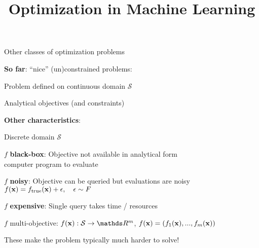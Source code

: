 \documentclass[11pt,compress,t,notes=noshow, xcolor=table]{beamer}
\title{Optimization in Machine Learning}
\begin{document}

\begin{framei}{Other classes of optimization problems}
\item \textbf{So far}: \enquote{nice} (un)constrained problems:
\begin{itemizeL}
\item Problem defined on continuous domain $\mathcal{S}$
\item Analytical objectives (and constraints)
\end{itemizeL}
\item \textbf{Other characteristics}:
\begin{itemizeL}
\item Discrete domain $\mathcal{S}$
\item $f$ \textbf{black-box}: Objective not available in analytical form\\computer program to evaluate
\item $f$ \textbf{noisy}: Objective can be queried but evaluations are noisy $f(\mathbf{x}) = f_{\text{true}}(\mathbf{x}) + \epsilon, \quad \epsilon \sim F$
\item $f$ \textbf{expensive}: Single query takes time / resources
\item $f$ multi-objective: $\fx: \mathcal{S} \to \R^m$, $f(\mathbf{x}) = \left(f_1(\mathbf{x}), ..., f_m(\mathbf{x})\right)$
\end{itemizeL}
\item These make the problem typically much harder to solve!
\end{framei}
\end{document}
